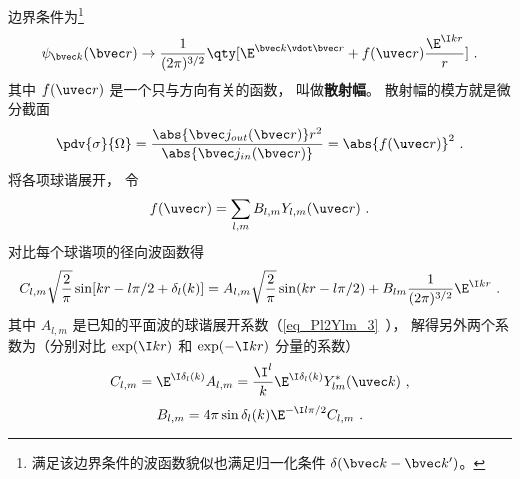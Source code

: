 边界条件为\footnote{满足该边界条件的波函数貌似也满足归一化条件 $\delta(\bvec k - \bvec k')$。}
\begin{equation}
\psi_{\bvec k}(\bvec r) \to \frac{1}{(2\pi)^{3/2}} \qty[\E^{\bvec k \vdot \bvec r} + f(\uvec r) \frac{\E^{\I kr}}{r}]~.
\end{equation}
其中 $f(\uvec r)$ 是一个只与方向有关的函数， 叫做\textbf{散射幅}。 散射幅的模方就是微分截面
\begin{equation}
\pdv{\sigma}{\Omega} = \frac{\abs{\bvec j_{out}(\bvec r)}r^2}{\abs{\bvec j_{in}(\bvec r)}}
= \abs{f(\uvec r)}^2~.
\end{equation}
将各项球谐展开， 令
\begin{equation}
f(\uvec r) = \sum_{l, m} B_{l,m} Y_{l,m}(\uvec r)~.
\end{equation}
对比每个球谐项的径向波函数得
\begin{equation}
C_{l,m} \sqrt{\frac{2}{\pi}} \sin[kr -l\pi/2 + \delta_l(k)] = A_{l,m}  \sqrt{\frac{2}{\pi}} \sin(kr - l \pi/2) + B_{lm} \frac{1}{(2\pi)^{3/2}} \E^{\I kr}~.
\end{equation}
其中 $A_{l,m}$ 是已知的平面波的球谐展开系数（\autoref{eq_Pl2Ylm_3}~）， 解得另外两个系数为（分别对比 $\exp(\I kr)$ 和 $\exp(-\I kr)$ 分量的系数）
\begin{equation}
C_{l,m} = \E^{\I\delta_l(k)} A_{l, m} = \frac{\I^l}{k} \E^{\I\delta_l(k)} Y_{lm}^*(\uvec k)~,
\end{equation}
\begin{equation}
B_{l,m} =4\pi \sin\delta_l(k) \E^{-\I l\pi/2} C_{l,m}~.
\end{equation}
